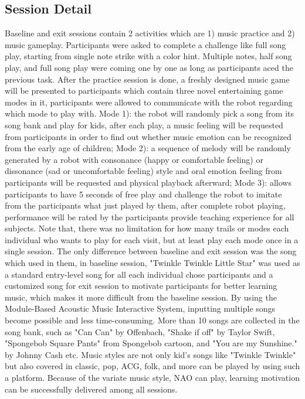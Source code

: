 \subsection{Session Detail}
Baseline and exit sessions contain 2 activities which are 1) music practice and 2) music gameplay.
Participants were asked to complete a challenge like full song play, starting from single note strike
with a color hint. Multiple notes, half song play, and full song play were coming one by one as long as 
participants aced the previous task. After the practice session is done, a freshly designed music game will be 
presented to participants which contain three novel entertaining game modes in it, participants
were allowed to communicate with the robot regarding which mode to play with. Mode 1): the robot will randomly
pick a song from its song bank and play for kids, after each play, a music feeling will be requested from 
participants in order to find out whether music emotion can be recognized from the early age of children; 
Mode 2): a sequence of melody will be randomly generated by a robot with consonance (happy or comfortable feeling) 
or dissonance (sad or uncomfortable feeling) style and oral emotion feeling from participants will be requested 
and physical playback afterward; Mode 3): allows participants to have 5 seconds of free play and challenge the robot to
imitate from the participants what just played by them, after complete robot playing, performance will be rated by
the participants provide teaching experience for all subjects. Note that, there was no limitation 
for how many trails or modes each individual who wants to play for each visit, but at least play each mode 
once in a single session. The only difference between baseline and exit session was the song which used in them, 
in baseline session, "Twinkle Twinkle Little Star" was used as a standard entry-level song for all 
each individual chose participants and a customized song for exit session to 
motivate participants for better learning music, which makes it more difficult from the baseline session. 
By using the Module-Based Acoustic Music Interactive System, inputting multiple songs become possible and
less time-consuming. More than 10 songs are collected in the song bank, such as "Can Can" by Offenbach, 
"Shake if off" by Taylor Swift, "Spongebob Square Pants" from Spongebob cartoon, and "You are my Sunshine."
by Johnny Cash etc. Music styles are not only kid's songs like "Twinkle Twinkle" but also covered in classic, 
pop, ACG, folk, and more can be played by using such a platform. Because of the variate music style, NAO
can play, learning motivation can be successfully delivered among all sessions.\\

